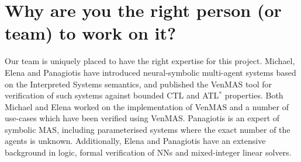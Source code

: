 \documentclass[11pt]{article}
\begin{document}
\begin{center}
\end{center}

\section{Why are you the right person (or
team) to work on it?}


Our team is uniquely placed to have the right expertise for this
project. Michael, Elena and Panagiotis have introduced neural-symbolic
multi-agent systems based on the Interpreted Systems semantics, and
published the VenMAS tool for verification of such systems against bounded
CTL and ATL$^*$ properties.  Both Michael and Elena worked on the
implementation of VenMAS and a number of use-cases which have been
verified using VenMAS.  Panagiotis is an expert of symbolic MAS,
including parameterised systems where the exact number of the agents
is unknown.  Additionally, Elena and Panagiotis have an extensive
background in logic, formal verification of NNs and mixed-integer
linear solvers.
\end{document}
